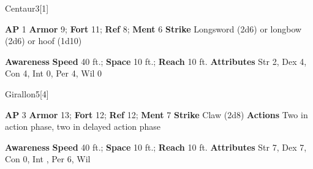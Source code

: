 \begin{monsection}{Centaur}{3}[1]
\vspace{-1em}\vspace{-1em}
\begin{spellcontent}
\begin{spelltargetinginfo}
{\textbf{AP} 1}
\pari \textbf{Armor} 9;
\textbf{Fort} 11;
\textbf{Ref} 8;
\textbf{Ment} 6
\pari \textbf{Strike} Longsword  (2d6) or longbow  (2d6) or hoof  (1d10)
\end{spelltargetinginfo}
\end{spellcontent}
\begin{spellsubcontent}
\begin{spellfooter}
\pari \textbf{Awareness} 
\pari \textbf{Speed} 40 ft.;
\textbf{Space} 10 ft.;
\textbf{Reach} 10 ft.
\pari \textbf{Attributes}
Str 2,
Dex 4,
Con 4,
Int 0,
Per 4,
Wil 0
\end{spellfooter}
\end{spellsubcontent}
\end{monsection}
\begin{monsection}{Girallon}{5}[4]
\vspace{-1em}\vspace{-1em}
\begin{spellcontent}
\begin{spelltargetinginfo}
{\textbf{AP} 3}
\pari \textbf{Armor} 13;
\textbf{Fort} 12;
\textbf{Ref} 12;
\textbf{Ment} 7
\pari \textbf{Strike} Claw  (2d8)
\pari \textbf{Actions} Two in action phase, two in delayed action phase
\end{spelltargetinginfo}
\end{spellcontent}
\begin{spellsubcontent}
\begin{spellfooter}
\pari \textbf{Awareness} 
\pari \textbf{Speed} 40 ft.;
\textbf{Space} 10 ft.;
\textbf{Reach} 10 ft.
\pari \textbf{Attributes}
Str 7,
Dex 7,
Con 0,
Int ,
Per 6,
Wil 
\end{spellfooter}
\end{spellsubcontent}
\end{monsection}
